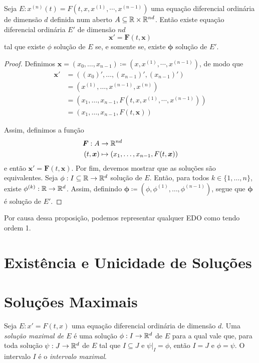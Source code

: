 \begin{prop}
	Seja $E: x^{(n)}(t) = F(t, x, x^{(1)}, \cdots,x^{(n-1)})$ uma equação diferencial ordinária de dimensão $d$ definida num aberto $A \subseteq \mathbb{R} \times \mathbb{R}^{nd}$. Então existe equação diferencial ordinária $E'$ de dimensão $nd$
	\begin{equation*}
	 \bm x' = \bm F(t,\bm x)
	\end{equation*}	
tal que existe $\phi$ solução de $E$ se, e somente se, existe $\bm \phi$ solução de $E'$.
\end{prop}
\begin{proof}
	Definimos $\bm x = (x_0, \ldots,x_{n-1}) \coloneqq (x,x^{(1)}, \cdots,x^{(n-1)})$, de modo que
	\begin{align*}
	\bm x' &= ((x_0)',\ldots,(x_{n-1})',(x_{n-1})') \\
			&= (x^{(1)}, \ldots,x^{(n-1)},x^{(n)}) \\
			&= (x_1,\ldots,x_{n-1},F(t, x, x^{(1)}, \cdots,x^{(n-1)})) \\
			&= (x_1,\ldots,x_{n-1},F(t,\bm x))
	\end{align*}	

	Assim, definimos a função
	\begin{align*}
	\bm F: A &\to \mathbb{R}^{nd} \\
	(t,\bm x) &\mapsto (x_1,\ldots,x_{n-1},F(t, \bm x))
	\end{align*}
e então $\bm x' = \bm F(t,\bm x)$. Por fim, devemos mostrar que as soluções são equivalentes. Seja $\phi: I \subseteq \mathbb{R} \to \mathbb{R}^d$ solução de $E$. Então, para todos $k \in \{1,\ldots,n\}$, existe $\phi^{(k)}: \mathbb{R} \to \mathbb{R}^d$. Assim, definindo $\bm \phi \coloneqq (\phi,\phi^{(1)},\ldots,\phi^{(n-1)})$, segue que $\bm \phi$ é solução de $E'$.
\end{proof}

Por causa dessa proposição, podemos representar qualquer EDO como tendo ordem 1.

\section{Existência e Unicidade de Soluções}



\section{Soluções Maximais}

\begin{defi}
	Seja $E: x'=F(t,x)$ uma equação diferencial ordinária de dimensão $d$. Uma \emph{solução maximal de $E$} é uma solução $\phi: I \to \mathbb{R}^d$ de $E$ para a qual vale que, para toda solução $\psi: J \to \mathbb{R}^d$ de $E$ tal que $I \subseteq J$ e $\psi|_I = \phi$, então $I = J$ e $\phi = \psi$. O intervalo $I$ é o \emph{intervalo maximal}.
\end{defi}

